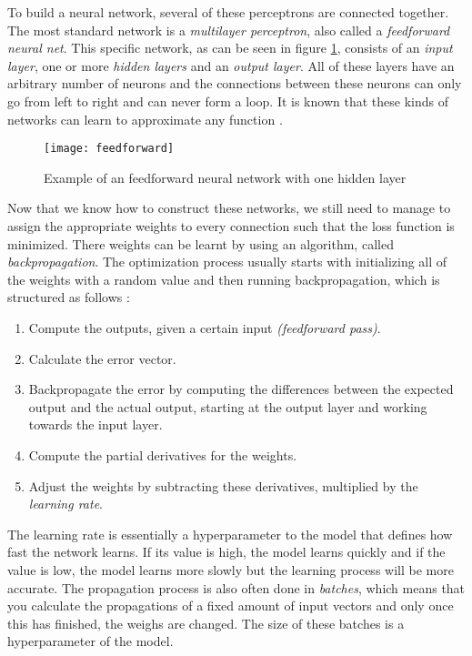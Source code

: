 To build a neural network, several of these perceptrons are connected together.
The most standard network is a \textit{multilayer perceptron}, also called a \textit{feedforward neural net}.
This specific network, as can be seen in figure \ref{fig:feedforward}, consists of an \textit{input layer}, one or more \textit{hidden layers} and an \textit{output layer}.
All of these layers have an arbitrary number of neurons and the connections between these neurons can only go from left to right and can never form a loop.
It is known that these kinds of networks can learn to approximate any function \cite{valiant2014learning}.

\begin{figure}[h]
  \centering
  \texttt{[image: feedforward]}
  \caption{Example of an feedforward neural network with one hidden layer}
  \label{fig:feedforward}
\end{figure}

Now that we know how to construct these networks, we still need to manage to assign the appropriate weights to every connection such that the loss function is minimized.
There weights can be learnt by using an algorithm, called \textit{backpropagation}.
The optimization process usually starts with initializing all of the weights with a random value and then running backpropagation, which is structured as follows \cite{nielsen_2017}:
\begin{enumerate}
  \item Compute the outputs, given a certain input \textit{(feedforward pass)}.
  \item Calculate the error vector.
  \item Backpropagate the error by computing the differences between the expected output and the actual output, starting at the output layer and working towards the input layer.
  \item Compute the partial derivatives for the weights.
  \item Adjust the weights by subtracting these derivatives, multiplied by the \textit{learning rate}.
\end{enumerate}

The learning rate is essentially a hyperparameter to the model that defines how fast the network learns.
If its value is high, the model learns quickly and if the value is low, the model learns more slowly but the learning process will be more accurate.
The propagation process is also often done in \textit{batches}, which means that you calculate the propagations of a fixed amount of input vectors and only once this has finished, the weighs are changed.
The size of these batches is a hyperparameter of the model.

